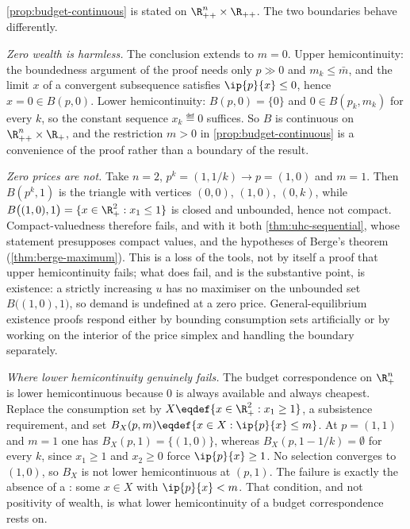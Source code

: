 \begin{eg}
	\label{eg:budget-failures}
	\autoref{prop:budget-continuous} is stated on
	$\R^{n}_{++}\times\R_{++}$. The two boundaries behave differently.

	\emph{Zero wealth is harmless.} The conclusion extends to $m=0$. Upper
	hemicontinuity: the boundedness argument of the proof needs only
	$p\gg0$ and $m_k\leq\bar m$, and the limit $x$ of a convergent subsequence
	satisfies $\ip{p}{x}\leq0$, hence $x=0\in B(p,0)$. Lower hemicontinuity:
	$B(p,0)=\{0\}$ and $0\in B(p_k,m_k)$ for every $k$, so the constant sequence
	$x_k\eqdef0$ suffices. So $B$ is continuous on $\R^n_{++}\times\R_+$, and the
	restriction $m>0$ in \autoref{prop:budget-continuous} is a convenience of the
	proof rather than a boundary of the result.

	\emph{Zero prices are not.} Take $n=2$, $p^{k}=(1,1/k)\to p=(1,0)$ and
	$m=1$. Then $B(p^{k},1)$ is the triangle with vertices $(0,0)$, $(1,0)$,
	$(0,k)$, while $B\bigl((1,0),1\bigr)=\{x\in\R^{2}_{+} : x_1\leq1\}$ is closed
	and unbounded, hence not compact. Compact-valuedness therefore fails, and with
	it both \autoref{thm:uhc-sequential}, whose statement presupposes compact
	values, and the hypotheses of Berge's theorem
	(\autoref{thm:berge-maximum}). This is a loss of the tools, not by itself a
	proof that upper hemicontinuity fails; what does fail, and is the substantive
	point, is existence: a strictly increasing $u$ has no maximiser on the
	unbounded set $B\bigl((1,0),1\bigr)$, so demand is undefined at a zero price.
	General-equilibrium existence proofs respond either by bounding consumption
	sets artificially or by working on the interior of the price simplex and
	handling the boundary separately.

	\emph{Where lower hemicontinuity genuinely fails.} The budget correspondence on
	$\R^n_+$ is lower hemicontinuous because $0$ is always available and always
	cheapest. Replace the consumption set by
	$X\eqdef\{x\in\R^2_+ : x_1\geq1\}$, a subsistence requirement, and set
	$B_X(p,m)\eqdef\{x\in X : \ip{p}{x}\leq m\}$. At $p=(1,1)$ and $m=1$ one has
	$B_X(p,1)=\{(1,0)\}$, whereas $B_X(p,1-1/k)=\emptyset$ for every $k$, since
	$x_1\geq1$ and $x_2\geq0$ force $\ip{p}{x}\geq1$. No selection converges to
	$(1,0)$, so $B_X$ is not lower hemicontinuous at $(p,1)$. The failure is
	exactly the absence of a : some $x\in X$
	with $\ip{p}{x}<m$. That condition, and not positivity of wealth, is what
	lower hemicontinuity of a budget correspondence rests on.
\end{eg}

